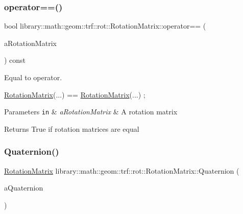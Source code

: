 \subsubsection{\texorpdfstring{operator==()}{operator==()}}
{\footnotesize\ttfamily bool library\+::math\+::geom\+::trf\+::rot\+::\+Rotation\+Matrix\+::operator== (\begin{DoxyParamCaption}\item[{const \hyperlink{classlibrary_1_1math_1_1geom_1_1trf_1_1rot_1_1_rotation_matrix}{Rotation\+Matrix} \&}]{a\+Rotation\+Matrix }\end{DoxyParamCaption}) const}



Equal to operator. 


\begin{DoxyCode}
\hyperlink{classlibrary_1_1math_1_1geom_1_1trf_1_1rot_1_1_rotation_matrix_a667d2c05aa5b0cc88775938d11164cdc}{RotationMatrix}(...) == \hyperlink{classlibrary_1_1math_1_1geom_1_1trf_1_1rot_1_1_rotation_matrix_a667d2c05aa5b0cc88775938d11164cdc}{RotationMatrix}(...) ;
\end{DoxyCode}



\begin{DoxyParams}[1]{Parameters}
\mbox{\tt in}  & {\em a\+Rotation\+Matrix} & A rotation matrix \\
\hline
\end{DoxyParams}
\begin{DoxyReturn}{Returns}
True if rotation matrices are equal 
\end{DoxyReturn}
\mbox{\label{classlibrary_1_1math_1_1geom_1_1trf_1_1rot_1_1_rotation_matrix_aba9c64b7b25d9819358c0caba6c388e2}} 
\subsubsection{\texorpdfstring{Quaternion()}{Quaternion()}}
{\footnotesize\ttfamily \hyperlink{classlibrary_1_1math_1_1geom_1_1trf_1_1rot_1_1_rotation_matrix}{Rotation\+Matrix} library\+::math\+::geom\+::trf\+::rot\+::\+Rotation\+Matrix\+::\+Quaternion (\begin{DoxyParamCaption}\item[{const \hyperlink{classlibrary_1_1math_1_1geom_1_1trf_1_1rot_1_1_quaternion}{rot\+::\+Quaternion} \&}]{a\+Quaternion }\end{DoxyParamCaption})\hspace{0.3cm}{\ttfamily [static]}}



